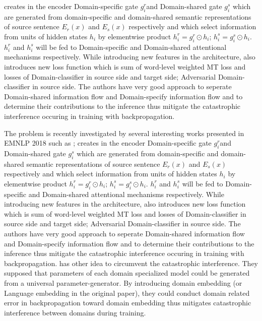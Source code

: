 \documentclass[11pt,a4paper]{article}
\begin{document}
creates in the encoder Domain-specific gate $g^r_i$and Domain-shared gate $g^s_i$ which are generated from domain-specific and domain-shared semantic representations of source sentence $E_r(x)$ and $E_s(x)$ respectively and which select information from units of hidden states $h_i$ by elementwise product $h^r_i = g^r_i \odot h_i$; $h^s_i = g^s_i \odot h_i$. $h^r_i$ and $h^s_i$ will be fed to Domain-specific and Domain-shared attentional mechanisms respectively. While introducing new features in the architecture, \cite{Zeng18multidomain} also introduces new loss function which is sum of word-level weighted MT loss and losses of Domain-classifier in source side and target side; Adversarial Domain-classifier in source side. The authors have very good approach to seperate Domain-shared information flow and Domain-specify information flow and to determine their contributions to the inference thus mitigate the catastrophic interference occuring in training with backpropagation.

The problem is recently investigated by several interesting works presented in EMNLP 2018 such as \cite{Platanios18contextual}; \cite{Zeng18multidomain} creates in the encoder Domain-specific gate $g^r_i$and Domain-shared gate $g^s_i$ which are generated from domain-specific and domain-shared semantic representations of source sentence $E_r(x)$ and $E_s(x)$ respectively and which select information from units of hidden states $h_i$ by elementwise product $h^r_i = g^r_i \odot h_i$; $h^s_i = g^s_i \odot h_i$. $h^r_i$ and $h^s_i$ will be fed to Domain-specific and Domain-shared attentional mechanisms respectively. While introducing new features in the architecture, \cite{Zeng18multidomain} also introduces new loss function which is sum of word-level weighted MT loss and losses of Domain-classifier in source side and target side; Adversarial Domain-classifier in source side. The authors have very good approach to seperate Domain-shared information flow and Domain-specify information flow and to determine their contributions to the inference thus mitigate the catastrophic interference occuring in training with backpropagation. \cite{Platanios18contextual} has other idea to circumvent the catastrophic interference. They supposed that parameters of each domain specialized model could be generated from a universal parameter-generator. By introducing domain embedding (or Language embedding in the original paper), they could conduct domain related error in backpropagation toward domain embedding thus mitigates catastrophic interference between domains during training.
\end{document}
